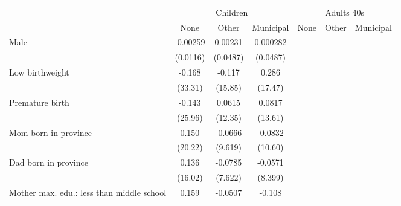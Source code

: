 {
\def\sym#1{\ifmmode^{#1}\else\(^{#1}\)\fi}
\begin{tabular}{l*{6}{c}}
\toprule
& \multicolumn{3}{c}{Children} &  \multicolumn{3}{c}{Adults 40s} \\
                    &\multicolumn{1}{c}{None}&\multicolumn{1}{c}{Other}&\multicolumn{1}{c}{Municipal}&\multicolumn{1}{c}{None}&\multicolumn{1}{c}{Other}&\multicolumn{1}{c}{Municipal}\\
\midrule
Male                &    -0.00259         &     0.00231         &    0.000282         &                     &                     &                     \\
                    &    (0.0116)         &    (0.0487)         &    (0.0487)         &                     &                     &                     \\
\addlinespace
Low birthweight     &      -0.168         &      -0.117         &       0.286         &                     &                     &                     \\
                    &     (33.31)         &     (15.85)         &     (17.47)         &                     &                     &                     \\
\addlinespace
Premature birth     &      -0.143         &      0.0615         &      0.0817         &                     &                     &                     \\
                    &     (25.96)         &     (12.35)         &     (13.61)         &                     &                     &                     \\
\addlinespace
Mom born in province&       0.150         &     -0.0666         &     -0.0832         &                     &                     &                     \\
                    &     (20.22)         &     (9.619)         &     (10.60)         &                     &                     &                     \\
\addlinespace
Dad born in province&       0.136         &     -0.0785         &     -0.0571         &                     &                     &                     \\
                    &     (16.02)         &     (7.622)         &     (8.399)         &                     &                     &                     \\
\addlinespace
Mother max. edu.: less than middle school&       0.159         &     -0.0507         &      -0.108         &                     &                     &                     \\

\end{tabular}}
